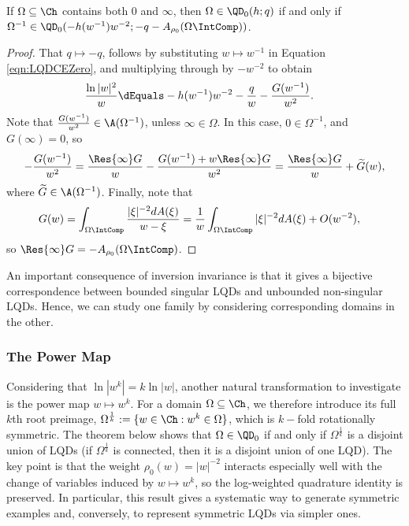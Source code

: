 \documentclass{article}
\numberwithin{equation}{section}
\begin{document}
\begin{corollary}\label{cor:LQDInversion}
If $\Omega\subseteq\Ch$ contains both $0$ and $\infty$, then $\Omega\in\QD_0(h;q)$ if and only if $\Omega^{-1}\in\QD_0(-h(w^{-1})w^{-2};-q-A_{\rho_0}(\Omega\IntComp))$.
\end{corollary}
\begin{proof}
That $q\mapsto-q$, follows by substituting $w\mapsto w^{-1}$ in Equation \ref{eqn:LQDCEZero}, and multiplying through by $-w^{-2}$ to obtain
\begin{align*}
    \dfrac{\ln|w|^2}{w}&\dEquals -h(w^{-1})w^{-2}-\dfrac{q}{w}-\dfrac{G(w^{-1})}{w^2}.
\end{align*}
Note that $\frac{G(w^{-1})}{w^2}\in\A(\Omega^{-1})$, unless $\infty\in\Omega$. In this case, $0\in\Omega^{-1}$, and $G(\infty)=0$, so
$$-\dfrac{G(w^{-1})}{w^2}=\dfrac{\Res{\infty}G}{w}-\dfrac{G(w^{-1})+w\Res{\infty}G}{w^2}=\dfrac{\Res{\infty}G}{w}+\widetilde{G}(w),$$
where $\widetilde{G}\in\A(\Omega^{-1})$. Finally, note that
\begin{align*}
    G(w)&=\int_{\Omega\IntComp}\dfrac{|\xi|^{-2}dA(\xi)}{w-\xi}=\dfrac{1}{w}\int_{\Omega\IntComp}|\xi|^{-2}dA(\xi)+O(w^{-2}),
\end{align*}
so $\Res{\infty}G=-A_{\rho_0}(\Omega\IntComp)$.
\end{proof}

An important consequence of inversion invariance is that it gives a bijective correspondence between bounded singular LQDs and unbounded non-singular LQDs. Hence, we can study one family by considering corresponding domains in the other.





\subsubsection{The Power Map}\label{subsubsec:PowerInvariance}
Considering that $\ln|w^k|=k\ln|w|$, another natural transformation to investigate is the power map $w\mapsto w^k$. For a domain $\Omega\subseteq\Ch$, we therefore introduce its full $k$th root preimage, $\Omega^{\frac{1}{k}}:=\{w\in\Ch:w^k\in\Omega\}$, which is $k-$fold rotationally symmetric. The theorem below shows that $\Omega\in\QD_0$ if and only if $\Omega^{\frac{1}{k}}$ is a disjoint union of LQDs (if $\Omega^{\frac{1}{k}}$ is connected, then it is a disjoint union of one LQD). The key point is that the weight $\rho_0(w)=|w|^{-2}$ interacts especially well with the change of variables induced by $w\mapsto w^k$, so the log-weighted quadrature identity is preserved. In particular, this result gives a systematic way to generate symmetric examples and, conversely, to represent symmetric LQDs via simpler ones.
\end{document}
